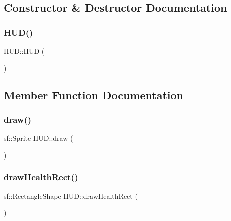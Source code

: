 \subsection{Constructor \& Destructor Documentation}
\mbox{\label{class_h_u_d_a568b8ee1591f9ba3ed36ae05966f6b56}} 
\subsubsection{\texorpdfstring{H\+U\+D()}{HUD()}}
{\footnotesize\ttfamily H\+U\+D\+::\+H\+UD (\begin{DoxyParamCaption}{ }\end{DoxyParamCaption})}



\subsection{Member Function Documentation}
\mbox{\label{class_h_u_d_a56cec922eca7a584bdc3799fbeaaf990}} 
\subsubsection{\texorpdfstring{draw()}{draw()}}
{\footnotesize\ttfamily sf\+::\+Sprite H\+U\+D\+::draw (\begin{DoxyParamCaption}{ }\end{DoxyParamCaption})}

\mbox{\label{class_h_u_d_aa87cf43eb5aa5c6e0c050f7d46064fbc}} 
\subsubsection{\texorpdfstring{draw\+Health\+Rect()}{drawHealthRect()}}
{\footnotesize\ttfamily sf\+::\+Rectangle\+Shape H\+U\+D\+::draw\+Health\+Rect (\begin{DoxyParamCaption}{ }\end{DoxyParamCaption})}

\mbox{\label{class_h_u_d_acdbc5c7a94d57dd938a3d5b8514f1d78}} 
